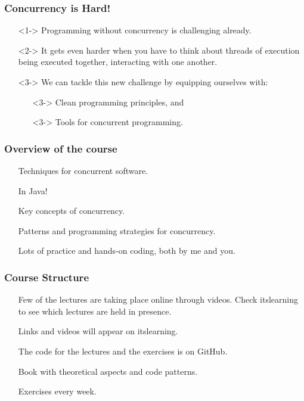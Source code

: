 \documentclass[xcolor={dvipsnames,svgnames},aspectratio=169]{beamer}
\begin{document}
\begin{frame}[fragile]
  \frametitle{Concurrency is Hard!}

  \begin{itemize}
  \item[\faBook]<1-> Programming without concurrency is challenging already.
  \item[\faBook]<2-> It gets even harder when you have to think about threads of
    execution being executed together, interacting with one another.
  \item[\faBook]<3-> We can tackle this new challenge by equipping
    ourselves with:
    \begin{itemize}
    \item[\faCode]<3-> Clean programming principles, and
    \item[\faCode]<3-> Tools for concurrent programming.
    \end{itemize}
  \end{itemize}
\end{frame}

\begin{frame}[fragile]
  \frametitle{Overview of the course}

  \begin{itemize}
  \item[\faBook] Techniques for concurrent software.
  \item[\faJava] In Java!
  \item[\faBook] Key concepts of concurrency.
  \item[\faBook] Patterns and programming strategies for concurrency.
  \item[\faCode] Lots of practice and hands-on coding, both by me and you.
  \end{itemize}
\end{frame}

\begin{frame}[fragile]
  \frametitle{Course Structure}

  \begin{itemize}
  \item[\faBullhorn] Few of the lectures are taking place online through
    videos. Check itslearning to see which lectures are held in presence.
  \item[\faSchool] Links and videos will appear on itslearning.
  \item[\faGithub] The code for the lectures and the exercises is on GitHub.
  \item[\faBook] Book with theoretical aspects and code patterns.
  \item[\faCode] Exercises every week.
  \end{itemize}
\end{frame}
\end{document}
